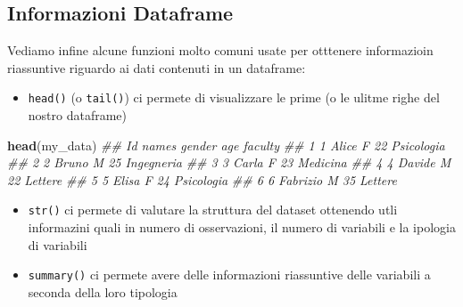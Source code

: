\documentclass[
]{book}
\newenvironment{Shaded}{\begin{snugshade}}{\end{snugshade}}
\newcommand{\CommentTok}[1]{\textcolor[rgb]{0.56,0.35,0.01}{\textit{#1}}}
\newcommand{\KeywordTok}[1]{\textcolor[rgb]{0.13,0.29,0.53}{\textbf{#1}}}
\newcommand{\NormalTok}[1]{#1}
\providecommand{\tightlist}{%
  \setlength{\itemsep}{0pt}\setlength{\parskip}{0pt}}
\begin{document}
\hypertarget{informazioni-dataframe}{%
\subsection{Informazioni Dataframe}\label{informazioni-dataframe}}

Vediamo infine alcune funzioni molto comuni usate per otttenere informazioin riassuntive riguardo ai dati contenuti in un dataframe:

\begin{itemize}
\tightlist
\item
  \texttt{head()} (o \texttt{tail()}) ci permete di visualizzare le prime (o le ulitme righe del nostro dataframe)
\end{itemize}

\begin{Shaded}
\begin{Highlighting}[]
\KeywordTok{head}\NormalTok{(my_data)}
\CommentTok{##   Id    names gender age    faculty}
\CommentTok{## 1  1    Alice      F  22 Psicologia}
\CommentTok{## 2  2    Bruno      M  25 Ingegneria}
\CommentTok{## 3  3    Carla      F  23   Medicina}
\CommentTok{## 4  4   Davide      M  22    Lettere}
\CommentTok{## 5  5    Elisa      F  24 Psicologia}
\CommentTok{## 6  6 Fabrizio      M  35    Lettere}
\end{Highlighting}
\end{Shaded}

\begin{itemize}
\tightlist
\item
  \texttt{str()} ci permete di valutare la struttura del dataset ottenendo utli informazini quali in numero di osservazioni, il numero di variabili e la ipologia di variabili
\end{itemize}

\begin{Shaded}
\end{Shaded}

\begin{itemize}
\tightlist
\item
  \texttt{summary()} ci permete avere delle informazioni riassuntive delle variabili a seconda della loro tipologia
\end{itemize}
\end{document}
